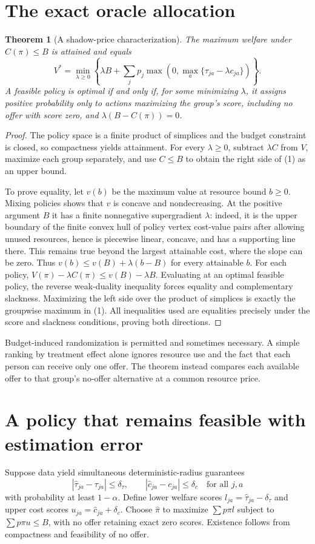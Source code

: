 \documentclass[11pt,a4paper]{article}
\newtheorem{theorem}{Theorem}[section]
\theoremstyle{remark}
\begin{document}
\section{The exact oracle allocation}
\begin{theorem}[A shadow-price characterization]
The maximum welfare under $C(\pi)\le B$ is attained and equals
\[
 V^*=\min_{\lambda\ge0}\left\{
 \lambda B+\sum_jp_j\max\left(0,\max_a\{\tau_{ja}-\lambda c_{ja}\}\right)\right\}. \tag{1}
\]
A feasible policy is optimal if and only if, for some minimizing $\lambda$, it assigns positive probability only to actions maximizing the group's score, including no offer with score zero, and $\lambda(B-C(\pi))=0$.
\end{theorem}
\begin{proof}
The policy space is a finite product of simplices and the budget constraint is closed, so compactness yields attainment. For every $\lambda\ge0$, subtract $\lambda C$ from $V$, maximize each group separately, and use $C\le B$ to obtain the right side of (1) as an upper bound.

To prove equality, let $v(b)$ be the maximum value at resource bound $b\ge0$. Mixing policies shows that $v$ is concave and nondecreasing. At the positive argument $B$ it has a finite nonnegative supergradient $\lambda$: indeed, it is the upper boundary of the finite convex hull of policy vertex cost-value pairs after allowing unused resources, hence is piecewise linear, concave, and has a supporting line there. This remains true beyond the largest attainable cost, where the slope can be zero. Thus $v(b)\le v(B)+\lambda(b-B)$ for every attainable $b$. For each policy, $V(\pi)-\lambda C(\pi)\le v(B)-\lambda B$. Evaluating at an optimal feasible policy, the reverse weak-duality inequality forces equality and complementary slackness. Maximizing the left side over the product of simplices is exactly the groupwise maximum in (1). All inequalities used are equalities precisely under the score and slackness conditions, proving both directions.
\end{proof}
Budget-induced randomization is permitted and sometimes necessary. A simple ranking by treatment effect alone ignores resource use and the fact that each person can receive only one offer. The theorem instead compares each available offer to that group's no-offer alternative at a common resource price.

\section{A policy that remains feasible with estimation error}
Suppose data yield simultaneous deterministic-radius guarantees
\[
 |\widehat\tau_{ja}-\tau_{ja}|\le\delta_\tau,\qquad
 |\widehat c_{ja}-c_{ja}|\le\delta_c \quad\text{for all }j,a \tag{2}
\]
with probability at least $1-\alpha$. Define lower welfare scores $l_{ja}=\widehat\tau_{ja}-\delta_\tau$ and upper cost scores $u_{ja}=\widehat c_{ja}+\delta_c$. Choose $\widehat\pi$ to maximize $\sum p\pi l$ subject to $\sum p\pi u\le B$, with no offer retaining exact zero scores. Existence follows from compactness and feasibility of no offer.
\end{document}
